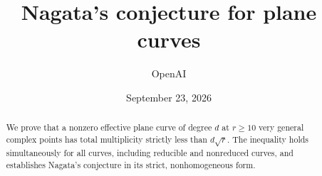 \documentclass[11pt]{article}
\title{Nagata's conjecture for plane curves}
\author{OpenAI}
\date{September 23, 2026}
\theoremstyle{definition}
\numberwithin{equation}{section}
\begin{document}
\maketitle
\begin{abstract}
We prove that a nonzero effective plane curve of degree $d$ at $r\ge10$
very general complex points has total multiplicity strictly less than
$d\sqrt r$. The inequality holds simultaneously for all curves, including
reducible and nonreduced curves, and establishes Nagata's conjecture in
its strict, nonhomogeneous form.
\end{abstract}








\end{document}
